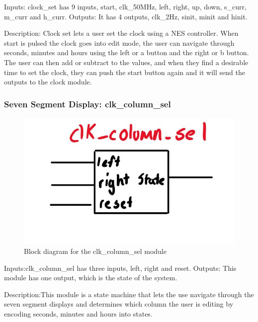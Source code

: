 \documentclass[a4paper]{article}
\begin{document}
Inputs: clock_set has 9 inputs, start, clk_50MHz, left, right, up, down, s_curr, m_curr and h_curr.
Outputs: It has 4 outputs, clk_2Hz, sinit, minit and hinit.

Description: Clock set lets a user set the clock using a NES controller. When start is pulsed the clock goes into edit mode, the user can navigate through seconds, minutes and hours using the left or a button and the right or b button. The user can then add or subtract to the values, and when they find a desirable time to set the clock, they can push the start button again and it will send the outputs to the clock module.

\subsubsection{Seven Segment Display: clk_column_sel}
\begin{figure}[H]
    \includegraphics[width=0.8 \linewidth]{images/clk_column_sel.JPG}
    \caption{Block diagram for the clk_column_sel module}
    \label{clk_column_sel}
\end{figure}

Inputs:clk_column_sel has three inputs, left, right and reset. 
Outputs: This module has one output, which is the state of the system. 

Description:This module is a state machine that lets the use navigate through the seven segment displays and determines which column the user is editing by encoding seconds, minutes and hours into states. 
\end{document}
